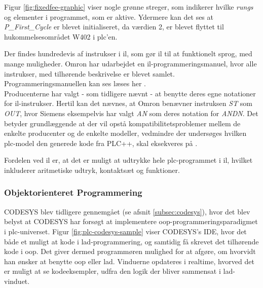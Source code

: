  

\noindent Figur \ref{fig:fixedfee-graphic} viser nogle grønne streger, som indikerer hvilke \textit{rungs} og elementer i programmet, som er aktive. Ydermere kan det ses at \textit{P\_First\_Cycle} er blevet initialiseret, da værdien 2, er blevet flyttet til hukommelsesområdet W402 i \gls{plc}'en.

Der findes hundredevis af instrukser i \gls{il}, som gør \gls{il} til at funktionelt sprog, med mange muligheder. Omron har udarbejdet en \gls{il}-programmeringsmanuel, hvor alle instrukser, med tilhørende beskrivelse er blevet samlet. Programmeringsmanuellen kan ses læses her \cite{omron-il-manuel}. \\ 

\noindent Producenterne har valgt - som tidligere nævnt - at benytte deres egne notationer for \gls{il}-instrukser. Hertil kan det nævnes, at Omron benævner instruksen \textit{ST} som \textit{OUT}, hvor Siemens eksempelvis har valgt \textit{AN} som deres notation for \textit{ANDN}. Det betyder grundlæggende at der vil opstå kompatibilitetsproblemer mellem de enkelte producenter og de enkelte modeller, vedmindre der undersøges hvilken \gls{plc}-model den generede kode fra PLC++, skal eksekveres på \cite{FDB_desc}.

Fordelen ved \gls{il} er, at det er muligt at udtrykke hele \gls{plc}-programmet i \gls{il}, hvilket inkluderer aritmetiske udtryk, kontaktsæt og funktioner. 

\subsubsection{Objektorienteret Programmering}
\label{subsec:software_codesys}

CODESYS blev tidligere gennemgået (se afsnit \ref{subsec:codesys}), hvor det blev belyst at CODESYS har forsøgt at implementere \gls{oop}-programmeringsparadigmet i \gls{plc}-universet. Figur \ref{fig:plc-codesys-sample} viser CODESYS's IDE, hvor det både et muligt at kode i \gls{lad}-programmering, og samtidig få skrevet det tilhørende kode i \gls{oop}. Det giver dermed programmøren mulighed for at afgøre, om hvorvidt han ønsker at benytte \gls{oop} eller \gls{lad}. Vinduerne opdateres i realtime, hvorved det er muligt at se kodeeksempler, udfra den logik der bliver sammensat i \gls{lad}-vinduet. 

